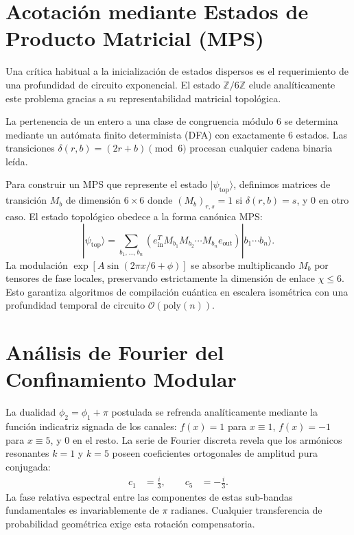 \documentclass[12pt,a4paper]{article}
\theoremstyle{plain}
\theoremstyle{definition}
\theoremstyle{remark}
\begin{document}
\section{Acotación mediante Estados de Producto Matricial (MPS)}
\label{app:mps}

Una crítica habitual a la inicialización de estados dispersos es el requerimiento de una profundidad de circuito exponencial. El estado $\mathbb{Z}/6\mathbb{Z}$ elude analíticamente este problema gracias a su representabilidad matricial topológica.

La pertenencia de un entero a una clase de congruencia módulo $6$ se determina mediante un autómata finito determinista (DFA) con exactamente $6$ estados. Las transiciones $\delta(r,b) = (2r+b) \pmod 6$ procesan cualquier cadena binaria leída.

Para construir un MPS que represente el estado $|\psi_{\text{top}}\rangle$, definimos matrices de transición $M_b$ de dimensión $6\times 6$ donde $(M_b)_{r,s} = 1$ si $\delta(r,b) = s$, y $0$ en otro caso. El estado topológico obedece a la forma canónica MPS:
\begin{equation}
|\psi_{\text{top}}\rangle = \sum_{b_1,\dots,b_n} \left( e_{\text{in}}^T M_{b_1} M_{b_2} \cdots M_{b_n} e_{\text{out}} \right) |b_1\cdots b_n\rangle.
\end{equation}
La modulación $\exp[A\sin(2\pi x/6 + \phi)]$ se absorbe multiplicando $M_b$ por tensores de fase locales, preservando estrictamente la dimensión de enlace $\chi \le 6$. Esto garantiza algoritmos de compilación cuántica en escalera isométrica con una profundidad temporal de circuito $\mathcal{O}(\text{poly}(n))$.

\section{Análisis de Fourier del Confinamiento Modular}
\label{app:fourier}

La dualidad $\phi_2 = \phi_1 + \pi$ postulada se refrenda analíticamente mediante la función indicatriz signada de los canales: $f(x) = 1$ para $x \equiv 1$, $f(x) = -1$ para $x \equiv 5$, y $0$ en el resto. La serie de Fourier discreta revela que los armónicos resonantes $k=1$ y $k=5$ poseen coeficientes ortogonales de amplitud pura conjugada:
\begin{align}
c_1 &= \frac{i}{3}, \qquad c_5 &= -\frac{i}{3}.
\end{align}
La fase relativa espectral entre las componentes de estas sub-bandas fundamentales es invariablemente de $\pi$ radianes. Cualquier transferencia de probabilidad geométrica exige esta rotación compensatoria.
\end{document}
